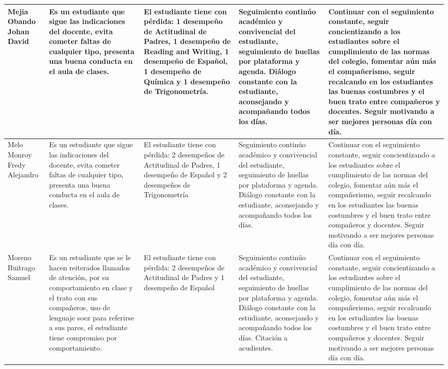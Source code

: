 \documentclass[spanish,11pt,a4paper]{article}
\begin{document}
\begin{longtable}{|p{3.5cm}|p{3.5cm}|p{3.5cm}|p{3.5cm}|p{3.5cm}|}
		Mejia Obando Johan David & 
		Es un estudiante que sigue las indicaciones del docente, evita cometer faltas de cualquier tipo, presenta una buena conducta en el aula de clases. & 
		El estudiante tiene con pérdida: 1 desempeño de Actitudinal de Padres, 1 desempeño de Reading and Writing, 1 desempeño de Español, 1 desempeño de Química y 1 desempeño de Trigonometría. & 
		Seguimiento continúo académico y convivencial del estudiante, seguimiento de huellas por plataforma y agenda. Diálogo constante con la estudiante, aconsejando y acompañando todos los días. & 
		Continuar con el seguimiento constante, seguir concientizando a los estudiantes sobre el cumplimiento de las normas del colegio, fomentar aún más el compañerismo, seguir recalcando en los estudiantes las buenas costumbres y el buen trato entre compañeros y docentes. Seguir motivando a ser mejores personas día con día.\\
		\hline
		
		Melo Monroy Fredy Alejandro & 
		Es un estudiante que sigue las indicaciones del docente, evita cometer faltas de cualquier tipo, presenta una buena conducta en el aula de clases. & 
		El estudiante tiene con pérdida: 2 desempeños de Actitudinal de Padres, 1 desempeño de Español y 2 desempeños de Trigonometría & 
		Seguimiento continúo académico y convivencial del estudiante, seguimiento de huellas por plataforma y agenda. Diálogo constante con la estudiante, aconsejando y acompañando todos los días. & 
		Continuar con el seguimiento constante, seguir concientizando a los estudiantes sobre el cumplimiento de las normas del colegio, fomentar aún más el compañerismo, seguir recalcando en los estudiantes las buenas costumbres y el buen trato entre compañeros y docentes. Seguir motivando a ser mejores personas día con día.\\
		\hline
		
		Moreno Buitrago Samuel & 
		Es un estudiante que se le hacen reiterados llamados de atención, por su comportamiento en clase y el trato con sus compañeros, uso de lenguaje soez para referirse a sus pares, el estudiante tiene compromiso por comportamiento. & 
		El estudiante tiene con pérdida: 2 desempeños de Actitudinal de Padres y 1 desempeño de Español & 
		Seguimiento continúo académico y convivencial del estudiante, seguimiento de huellas por plataforma y agenda. Diálogo constante con la estudiante, aconsejando y acompañando todos los días. Citación a acudientes. & 
		Continuar con el seguimiento constante, seguir concientizando a los estudiantes sobre el cumplimiento de las normas del colegio, fomentar aún más el compañerismo, seguir recalcando en los estudiantes las buenas costumbres y el buen trato entre compañeros y docentes. Seguir motivando a ser mejores personas día con día.\\
		\hline
		

\end{longtable}
\end{document}
